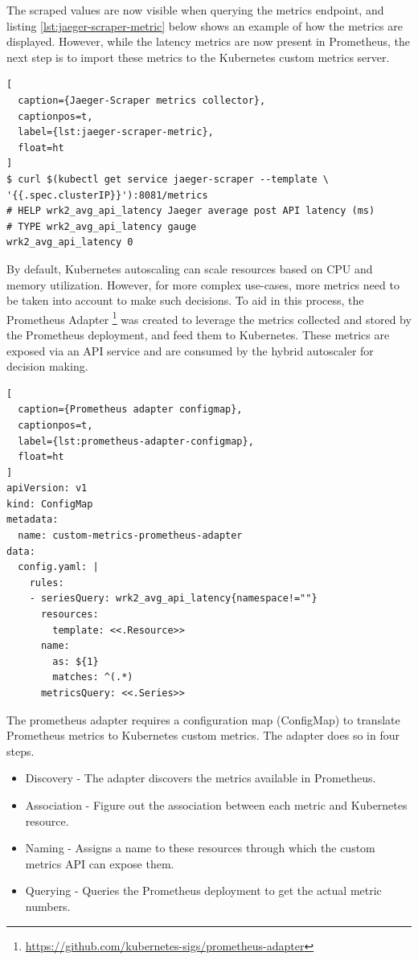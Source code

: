 The scraped values are now visible when querying the metrics endpoint, and listing \ref{lst:jaeger-scraper-metric} below shows an example of how the metrics are displayed. However, while the latency metrics are now present in Prometheus, the next step is to import these metrics to the Kubernetes custom metrics server.\par

\begin{lstlisting}[
  caption={Jaeger-Scraper metrics collector},
  captionpos=t,
  label={lst:jaeger-scraper-metric},
  float=ht
]
$ curl $(kubectl get service jaeger-scraper --template \
'{{.spec.clusterIP}}'):8081/metrics
# HELP wrk2_avg_api_latency Jaeger average post API latency (ms)
# TYPE wrk2_avg_api_latency gauge
wrk2_avg_api_latency 0
\end{lstlisting}

By default, Kubernetes autoscaling can scale resources based on CPU and memory utilization. However, for more complex use-cases, more metrics need to be taken into account to make such decisions. To aid in this process, the Prometheus Adapter \footnote{\url{https://github.com/kubernetes-sigs/prometheus-adapter}} was created to leverage the metrics collected and stored by the Prometheus deployment, and feed them to Kubernetes. These metrics are exposed via an API service and are consumed by the hybrid autoscaler for decision making.\par

\begin{lstlisting}[
  caption={Prometheus adapter configmap},
  captionpos=t,
  label={lst:prometheus-adapter-configmap},
  float=ht
]
apiVersion: v1
kind: ConfigMap
metadata:
  name: custom-metrics-prometheus-adapter
data:
  config.yaml: |
    rules:
    - seriesQuery: wrk2_avg_api_latency{namespace!=""}
      resources:
        template: <<.Resource>>
      name:
        as: ${1}
        matches: ^(.*)
      metricsQuery: <<.Series>>
\end{lstlisting}

The prometheus adapter requires a configuration map (ConfigMap) to translate Prometheus metrics to Kubernetes custom metrics. The adapter does so in four steps.

\begin{itemize}
    \item Discovery - The adapter discovers the metrics available in Prometheus.
    \item Association - Figure out the association between each metric and Kubernetes resource.
    \item Naming - Assigns a name to these resources through which the custom metrics API can expose them.
    \item Querying - Queries the Prometheus deployment to get the actual metric numbers.
\end{itemize}

